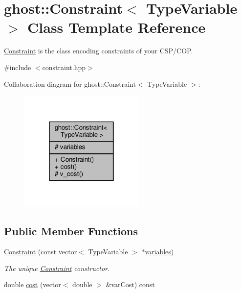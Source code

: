 \hypertarget{classghost_1_1Constraint}{}\section{ghost\+:\+:Constraint$<$ Type\+Variable $>$ Class Template Reference}
\label{classghost_1_1Constraint}


\hyperlink{classghost_1_1Constraint}{Constraint} is the class encoding constraints of your C\+S\+P/\+C\+OP.  




{\ttfamily \#include $<$constraint.\+hpp$>$}



Collaboration diagram for ghost\+:\+:Constraint$<$ Type\+Variable $>$\+:
\nopagebreak
\begin{figure}[H]
\begin{center}
\leavevmode
\includegraphics[width=178pt]{classghost_1_1Constraint__coll__graph}
\end{center}
\end{figure}
\subsection*{Public Member Functions}
\begin{DoxyCompactItemize}
\item 
\hyperlink{classghost_1_1Constraint_aa500115c399ec8f250416903bb85e526}{Constraint} (const vector$<$ Type\+Variable $>$ $\ast$\hyperlink{classghost_1_1Constraint_a83305933e19440f42428da0726261c4a}{variables})
\begin{DoxyCompactList}\small\item\em The unique \hyperlink{classghost_1_1Constraint}{Constraint} constructor. \end{DoxyCompactList}\item 
double \hyperlink{classghost_1_1Constraint_a9ca5281e18d0141400773e36e7b1633b}{cost} (vector$<$ double $>$ \&var\+Cost) const 
\end{DoxyCompactItemize}

